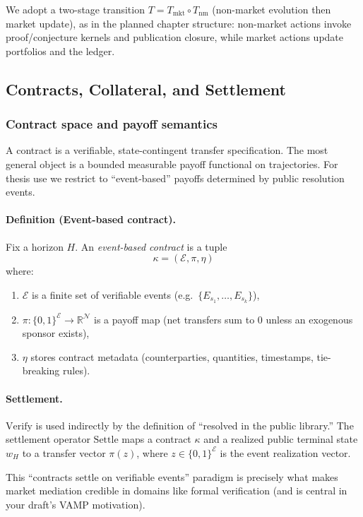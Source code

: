We adopt a two-stage transition \(T=T_{\mathrm{mkt}}\circ T_{\mathrm{nm}}\) (non-market evolution then market update), as in the planned chapter structure: non-market actions invoke proof/conjecture kernels and publication closure, while market actions update portfolios and the ledger.

\subsection{Contracts, Collateral, and Settlement}

\subsubsection{Contract space and payoff semantics}

A contract is a verifiable, state-contingent transfer specification. The most general object is a bounded measurable payoff functional on trajectories. For thesis use we restrict to ``event-based'' payoffs determined by public resolution events.

\paragraph{Definition (Event-based contract).}
Fix a horizon \(H\). An \emph{event-based contract} is a tuple
\[
\kappa=(\mathcal{E},\pi,\eta)
\]
where:
\begin{enumerate}
\item \(\mathcal{E}\) is a finite set of verifiable events (e.g.\ \(\{E_{s_1},\dots,E_{s_k}\}\)),
\item \(\pi:\{0,1\}^{\mathcal{E}}\to\mathbb{R}^{\mathcal{N}}\) is a payoff map (net transfers sum to \(0\) unless an exogenous sponsor exists),
\item \(\eta\) stores contract metadata (counterparties, quantities, timestamps, tie-breaking rules).
\end{enumerate}

\paragraph{Settlement.}
\(\mathrm{Verify}\) is used indirectly by the definition of ``resolved in the public library.'' The settlement operator \(\mathrm{Settle}\) maps a contract \(\kappa\) and a realized public terminal state \(w_H\) to a transfer vector \(\pi(z)\), where \(z\in\{0,1\}^{\mathcal{E}}\) is the event realization vector.

This ``contracts settle on verifiable events'' paradigm is precisely what makes market mediation credible in domains like formal verification (and is central in your draft's VAMP motivation).


